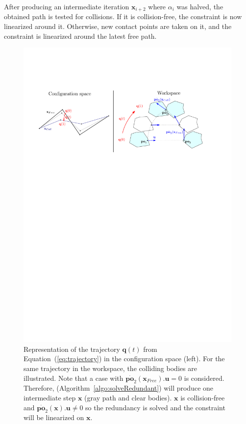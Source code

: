 \documentclass{tADR2e}
\newcommand\conf{\mathbf{q}}
\newcommand\xx{\mathbf{x}} %
\newcommand\po{\mathbf{po}}
\begin{document}
After producing an intermediate iteration $\xx_{i+2}$ where $\alpha_i$ was 
halved, the obtained path is tested for collisions. If it is collision-free, the 
constraint is now linearized around it. Otherwise, new contact points are taken 
on it, and the constraint is linearized around the latest free path.

\begin{figure}
	\centering
	\includegraphics[width=15.8cm]{convergence-diagram.pdf}
	\caption{Representation of the trajectory $\conf (t)$ from 
	Equation~(\ref{eq:trajectory}) in the 
	configuration space (left). For the same trajectory in the workspace, the 
	colliding bodies are illustrated. Note that a case with 
	$\dot{\po_2}(\xx_{Free}).\mathbf{u}=0$ is considered. Therefore, 
	(Algorithm~\ref{algo:solveRedundant}) will produce one intermediate step
	$\xx$ (gray path and clear bodies). $\xx$ is collision-free and 
	$\dot{\po_2}(\xx).\mathbf{u}\neq 0$ so the redundancy is solved and the
	constraint will be linearized on $\xx$.}
	\label{fig:convergence-diagram}
\end{figure}
\end{document}
